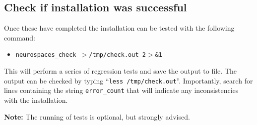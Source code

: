 \documentclass[12pt]{article}
\begin{document}


\subsection*{Check if installation was successful}

Once these have completed the installation can be tested with the following command:
\begin{itemize}
   \item[]{\tt neurospaces\_check $>$/tmp/check.out 2$>$\&1}
\end{itemize}
This will perform a series of regression tests and save the output to file. The output can be checked by typing ``{\tt less /tmp/check.out}''. Importantly, search for lines containing the string {\tt error\_count} that will indicate any inconsistencies with the installation.

{\bf Note:} The running of tests is optional, but strongly advised.
\end{document}
